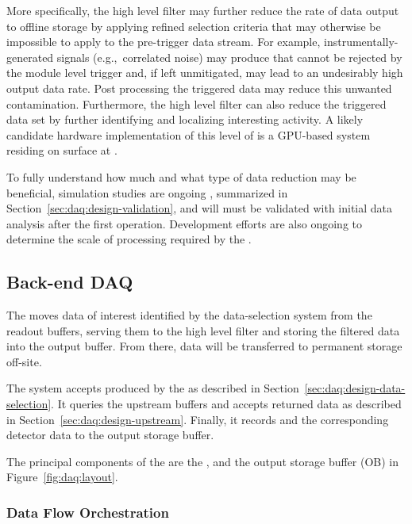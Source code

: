 More specifically, the high level filter may further reduce the rate of data output to offline storage by
applying refined selection criteria that may otherwise be impossible
to apply to the pre-trigger data stream.  For example, instrumentally-generated signals (e.g.,~correlated noise)
may produce  that cannot be rejected by the module
level trigger and, if left unmitigated, may lead to an undesirably high
output data rate. 
Post processing the triggered data may reduce this unwanted
contamination.
Furthermore, the high level filter can also reduce the triggered data set by further identifying
and localizing interesting activity. A likely candidate hardware
implementation of this level of  is a GPU-based system
residing on surface at .

To fully understand how much and what type of data reduction may be
beneficial, simulation studies are ongoing \cite{bib:docdb11311},
summarized in Section~\ref{sec:daq:design-validation}, and will
must be
validated with initial data analysis after the
first   operation. Development efforts are also ongoing to determine the scale of 
processing required by the .


\subsection{Back-end DAQ}
\label{sec:daq:design-backend}

The   moves data of interest identified by the data-selection system from the readout  buffers, 
serving them to the high level filter and storing the filtered data into the output buffer. From there, 
data will be transferred to permanent storage off-site.

The  system accepts  produced by the  as described
in Section~\ref{sec:daq:design-data-selection}.  It queries the upstream  buffers and
accepts returned data as described in Section~\ref{sec:daq:design-upstream}. Finally, it records
 and the corresponding detector data to the output storage buffer.

The principal components of the  are the ,  and the output
storage buffer (OB) in Figure~\ref{fig:daq:layout}.

\subsubsection{Data Flow Orchestration}

